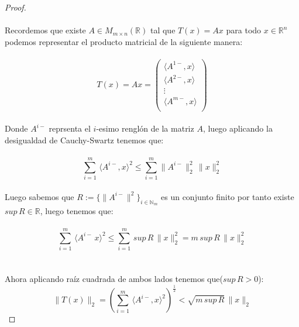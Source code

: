 \documentclass[11pt,letterpaper]{article}
\newcommand{\R}{\mathbb{R}}
\newcommand{\N}{\mathbb{N}}
\begin{document}
\begin{proof}\,\\
    \,\\
    Recordemos que existe $A\in M_{m\times n}(\R)$ tal que $T(x)=Ax$ para todo $x\in \R^n$
    podemos representar el producto matricial de la siguiente manera:\,\\
    \,\\
    \begin{equation*}
        T(x)=Ax=\begin{pmatrix}
            \langle A^{1-},x\rangle\\
            \langle A^{2-},x\rangle\\
            \vdots \\
            \langle A^{m-},x\rangle\\
        \end{pmatrix}
    \end{equation*}\,\\
    Donde $A^{i-}$ reprsenta el $i$-esimo rengl\'on de la matriz $A$, luego aplicando la desigualdad de Cauchy-Swartz tenemos que:\,\\
    \,\\
    \begin{equation*}
        \sum_{i=1}^{m}\,\langle A^{i-},x\rangle^2\leq \sum_{i=1}^m\|A^{i-}\|_2^2\,\|x\|_2^2
    \end{equation*} \,\\
    Luego sabemos que $R:=\{\|A^{i-}\|^2\}_{i\in \N_m}$ es un conjunto finito por tanto existe $sup\,R\in \R$, luego tenemos que:\,\\
    \,\\
    \begin{equation*}
        \sum_{i=1}^{m}\,\langle A^{i-}\,x\rangle^2\leq\sum_{i=1}^{m}\,sup\,R\,\|x\|_2^2=m\,sup\,R\,\|x\|_2^2
    \end{equation*}\,\\
    \,\\
    Ahora aplicando ra\'iz cuadrada de ambos lados tenemos que($sup\,R>0$):\,\\
    \begin{equation*}
        \|T(x)\|_2=\left(\sum_{i=1}^m\,\langle A^{i-},x \rangle^2\right)^{\frac{1}{2}}<\sqrt{m\,sup\,R}\,\|x\|_2
    \end{equation*}
\end{proof}
\end{document}
